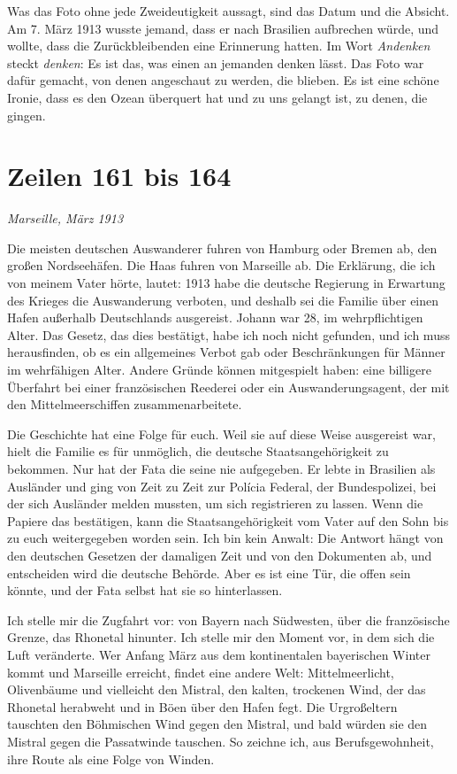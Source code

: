 \documentclass[
  ngerman,
  11pt,
  openany]{book}
\begin{document}
Was das Foto ohne jede Zweideutigkeit aussagt, sind das Datum und die
Absicht. Am 7. März 1913 wusste jemand, dass er nach Brasilien
aufbrechen würde, und wollte, dass die Zurückbleibenden eine Erinnerung
hatten. Im Wort \emph{Andenken} steckt \emph{denken}: Es ist das, was
einen an jemanden denken lässt. Das Foto war dafür gemacht, von denen
angeschaut zu werden, die blieben. Es ist eine schöne Ironie, dass es
den Ozean überquert hat und zu uns gelangt ist, zu denen, die gingen.

\section{Zeilen 161 bis 164}\label{zeilen-161-bis-164}

\emph{Marseille, März 1913}

Die meisten deutschen Auswanderer fuhren von Hamburg oder Bremen ab, den
großen Nordseehäfen. Die Haas fuhren von Marseille ab. Die Erklärung,
die ich von meinem Vater hörte, lautet: 1913 habe die deutsche Regierung
in Erwartung des Krieges die Auswanderung verboten, und deshalb sei die
Familie über einen Hafen außerhalb Deutschlands ausgereist. Johann war
28, im wehrpflichtigen Alter. Das Gesetz, das dies bestätigt, habe ich
noch nicht gefunden, und ich muss herausfinden, ob es ein allgemeines
Verbot gab oder Beschränkungen für Männer im wehrfähigen Alter. Andere
Gründe können mitgespielt haben: eine billigere Überfahrt bei einer
französischen Reederei oder ein Auswanderungsagent, der mit den
Mittelmeerschiffen zusammenarbeitete.

Die Geschichte hat eine Folge für euch. Weil sie auf diese Weise
ausgereist war, hielt die Familie es für unmöglich, die deutsche
Staatsangehörigkeit zu bekommen. Nur hat der Fata die seine nie
aufgegeben. Er lebte in Brasilien als Ausländer und ging von Zeit zu
Zeit zur Polícia Federal, der Bundespolizei, bei der sich Ausländer
melden mussten, um sich registrieren zu lassen. Wenn die Papiere das
bestätigen, kann die Staatsangehörigkeit vom Vater auf den Sohn bis zu
euch weitergegeben worden sein. Ich bin kein Anwalt: Die Antwort hängt
von den deutschen Gesetzen der damaligen Zeit und von den Dokumenten ab,
und entscheiden wird die deutsche Behörde. Aber es ist eine Tür, die
offen sein könnte, und der Fata selbst hat sie so hinterlassen.

Ich stelle mir die Zugfahrt vor: von Bayern nach Südwesten, über die
französische Grenze, das Rhonetal hinunter. Ich stelle mir den Moment
vor, in dem sich die Luft veränderte. Wer Anfang März aus dem
kontinentalen bayerischen Winter kommt und Marseille erreicht, findet
eine andere Welt: Mittelmeerlicht, Olivenbäume und vielleicht den
Mistral, den kalten, trockenen Wind, der das Rhonetal herabweht und in
Böen über den Hafen fegt. Die Urgroßeltern tauschten den Böhmischen Wind
gegen den Mistral, und bald würden sie den Mistral gegen die Passatwinde
tauschen. So zeichne ich, aus Berufsgewohnheit, ihre Route als eine
Folge von Winden.
\end{document}
